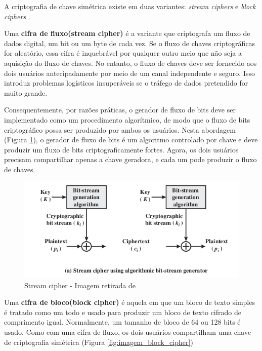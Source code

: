             A criptografia de chave simétrica existe em duas variantes: \textit{stream ciphers} e \textit{block ciphers} \cite{beginnig_blockchain_bikramaditya}.
            
            Uma \textbf{cifra de fluxo(stream cipher)} é a variante que criptografa um fluxo de dados digital, um bit ou um byte de cada vez. Se o fluxo de chaves criptográficas for aleatório, essa cifra é inquebrável por qualquer outro meio que não seja a aquisição do fluxo de chaves. No entanto, o fluxo de chaves deve ser fornecido aos dois usuários antecipadamente por meio de um canal independente e seguro. Isso introduz problemas logísticos insuperáveis se o tráfego de dados pretendido for muito grande.\cite{cryptograpy_and_network_stallings}
            
            Consequentemente, por razões práticas, o gerador de fluxo de bits deve ser implementado como um procedimento algorítmico, de modo que o fluxo de bits criptográfico possa ser produzido por ambos os usuários. Nesta abordagem (Figura \ref{fig:imagem_stream_cipher}), o gerador de fluxo de bits é um algoritmo controlado por chave e deve produzir um fluxo de bits criptograficamente fortes. Agora, os dois usuários precisam compartilhar apenas a chave geradora, e cada um pode produzir o fluxo de chaves.\cite{cryptograpy_and_network_stallings}
        
            
                \begin{figure}[H]
                     \centering
                     \includegraphics[scale=0.7]{figuras/capitulo_2/stream_cipher_generator.png}
                     \caption{Stream cipher - Imagem retirada de \cite{cryptograpy_and_network_stallings}}
                     \label{fig:imagem_stream_cipher}
                \end{figure}
        
            Uma \textbf{cifra de bloco(block cipher)} é aquela em que um bloco de texto simples é tratado como um todo e usado para produzir um bloco de texto cifrado de comprimento igual. Normalmente, um tamanho de bloco de 64 ou 128 bits é usado. Como com uma cifra de fluxo, os dois usuários compartilham uma chave de criptografia simétrica (Figura \ref{fig:imagem_block_cipher})

